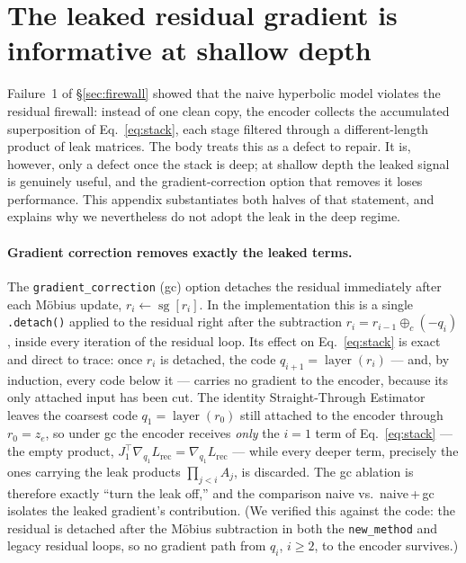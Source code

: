 \documentclass[12pt]{report}
\begin{document}
\section{The leaked residual gradient is informative at shallow depth}
\label{app:gc_leak}
Failure~1 of \S\ref{sec:firewall} showed that the naive hyperbolic model violates the residual firewall: instead of one clean copy, the encoder collects the accumulated superposition of Eq.~\ref{eq:stack}, each stage filtered through a different-length product of leak matrices. The body treats this as a defect to repair. It is, however, only a defect once the stack is deep; at shallow depth the leaked signal is genuinely useful, and the gradient-correction option that removes it loses performance. This appendix substantiates both halves of that statement, and explains why we nevertheless do not adopt the leak in the deep regime.

\paragraph{Gradient correction removes exactly the leaked terms.}
The \texttt{gradient\_correction} (gc) option detaches the residual immediately after each M\"obius update, $r_i\leftarrow\operatorname{sg}[r_i]$. In the implementation this is a single \texttt{.detach()} applied to the residual right after the subtraction $r_i=r_{i-1}\oplus_c(-q_i)$, inside every iteration of the residual loop. Its effect on Eq.~\ref{eq:stack} is exact and direct to trace: once $r_i$ is detached, the code $q_{i+1}=\operatorname{layer}(r_i)$ --- and, by induction, every code below it --- carries no gradient to the encoder, because its only attached input has been cut. The identity Straight-Through Estimator leaves the coarsest code $q_1=\operatorname{layer}(r_0)$ still attached to the encoder through $r_0=z_e$, so under gc the encoder receives \emph{only} the $i{=}1$ term of Eq.~\ref{eq:stack} --- the empty product, $J_1^{\top}\nabla_{q_1}L_{\text{rec}}=\nabla_{q_1}L_{\text{rec}}$ --- while every deeper term, precisely the ones carrying the leak products $\prod_{j<i}A_j$, is discarded. The gc ablation is therefore exactly ``turn the leak off,'' and the comparison naive vs.\ naive\,+\,gc isolates the leaked gradient's contribution. (We verified this against the code: the residual is detached after the M\"obius subtraction in both the \texttt{new\_method} and legacy residual loops, so no gradient path from $q_i$, $i\ge 2$, to the encoder survives.)
\end{document}
